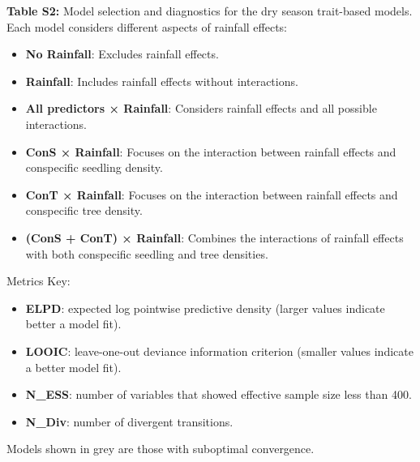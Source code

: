 \documentclass[
  12pt,
  letterpaper,
  DIV=11,
  numbers=noendperiod]{scrartcl}
\providecommand{\tightlist}{%
  \setlength{\itemsep}{0pt}\setlength{\parskip}{0pt}}\usepackage{longtable,booktabs,array}
\begin{document}
\newpage

\textbf{Table S2:} Model selection and diagnostics for the dry season
trait-based models. Each model considers different aspects of rainfall
effects:

\begin{itemize}
\tightlist
\item
  \textbf{No Rainfall}: Excludes rainfall effects.
\item
  \textbf{Rainfall}: Includes rainfall effects without interactions.
\item
  \textbf{All predictors × Rainfall}: Considers rainfall effects and all
  possible interactions.
\item
  \textbf{ConS × Rainfall}: Focuses on the interaction between rainfall
  effects and conspecific seedling density.
\item
  \textbf{ConT × Rainfall}: Focuses on the interaction between rainfall
  effects and conspecific tree density.
\item
  \textbf{(ConS + ConT) × Rainfall}: Combines the interactions of
  rainfall effects with both conspecific seedling and tree densities.
\end{itemize}

Metrics Key:

\begin{itemize}
\tightlist
\item
  \textbf{ELPD}: expected log pointwise predictive density (larger
  values indicate better a model fit).
\item
  \textbf{LOOIC}: leave-one-out deviance information criterion (smaller
  values indicate a better model fit).
\item
  \textbf{N\_ESS}: number of variables that showed effective sample size
  less than 400.
\item
  \textbf{N\_Div}: number of divergent transitions.
\end{itemize}

Models shown in grey are those with suboptimal convergence.
\end{document}
